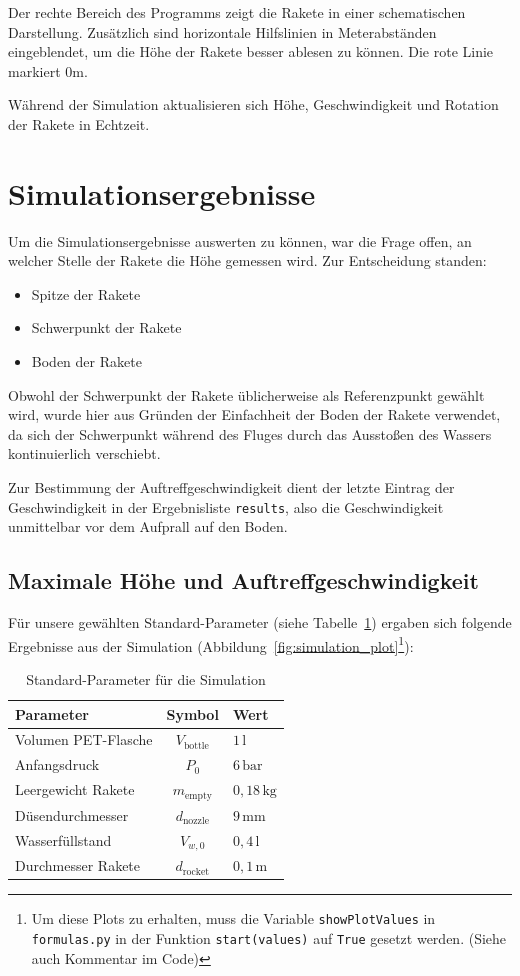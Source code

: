 \documentclass{SimSemBericht} %
\begin{document}
Der rechte Bereich des Programms zeigt die Rakete in einer schematischen
Darstellung. Zusätzlich sind horizontale Hilfslinien in Meterabständen
eingeblendet, um die Höhe der Rakete besser ablesen zu können.
\newline Die rote Linie markiert 0m.

Während der Simulation aktualisieren sich Höhe, Geschwindigkeit und
Rotation der Rakete in Echtzeit.
\section{Simulationsergebnisse}
Um die Simulationsergebnisse auswerten zu können, war die Frage offen, an welcher Stelle der Rakete die Höhe gemessen wird. Zur Entscheidung standen:
\begin{itemize}
    \item Spitze der Rakete
    \item Schwerpunkt der Rakete
    \item Boden der Rakete
\end{itemize}
Obwohl der Schwerpunkt der Rakete üblicherweise als Referenzpunkt gewählt wird, wurde hier aus Gründen der Einfachheit der Boden der Rakete verwendet, da sich der Schwerpunkt während des Fluges durch das Ausstoßen des Wassers kontinuierlich verschiebt.

Zur Bestimmung der Auftreffgeschwindigkeit dient der letzte Eintrag der Geschwindigkeit in der Ergebnisliste \texttt{results}, also die Geschwindigkeit unmittelbar vor dem Aufprall auf den Boden.
\subsection{Maximale Höhe und Auftreffgeschwindigkeit}
Für unsere gewählten Standard-Parameter (siehe Tabelle~\ref{tab:standardparameter}) ergaben sich folgende Ergebnisse aus der Simulation (Abbildung~\ref{fig:simulation_plot}\footnote{Um diese Plots zu erhalten, muss die Variable \texttt{showPlotValues} in \texttt{formulas.py} in der Funktion \texttt{start(values)} auf \texttt{True} gesetzt werden. (Siehe auch Kommentar im Code)}):
\begin{table}[ht]
    \centering
    \begin{tabular}{lcl}
        \textbf{Parameter} & \textbf{Symbol} & \textbf{Wert} \\
        \hline
        Volumen PET-Flasche & $V_{\text{bottle}}$ & $1\,\mathrm{l}$ \\
        Anfangsdruck & $P_0$ & $6\,\mathrm{bar}$ \\
        Leergewicht Rakete & $m_{\text{empty}}$ & $0{,}18\,\mathrm{kg}$ \\
        Düsendurchmesser & $d_{\text{nozzle}}$ & $9\,\mathrm{mm}$ \\
        Wasserfüllstand & $V_{w,0}$ & $0{,}4\,\mathrm{l}$ \\
        Durchmesser Rakete & $d_{\text{rocket}}$ & $0{,}1\,\mathrm{m}$ \\[6pt]
    \end{tabular}
    \caption{Standard-Parameter für die Simulation}
    \label{tab:standardparameter}
\end{table}
\end{document}
